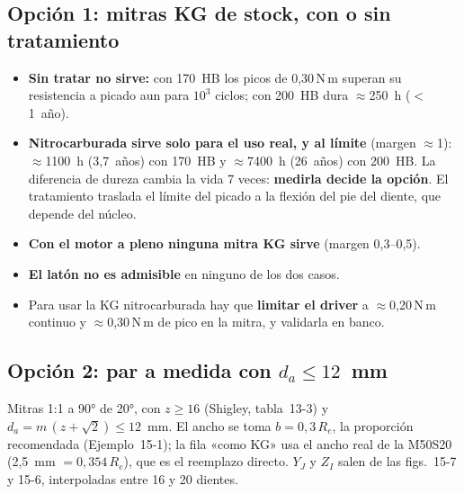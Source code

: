 \documentclass[11pt,a4paper]{article}
\newcommand{\Nm}{\,N\,m\xspace}
\begin{document}
\subsection{Opción 1: mitras KG de stock, con o sin tratamiento}
\begin{table}[H]\centering\small\setlength{\tabcolsep}{3pt}
\caption{Vida estimada de las mitras KG (d$_a$ 10,71~mm). Margen: torque admisible para 10~años sobre el aplicado,
continuo / pico. «a»: años de uso a 288~h por año.}
\label{tab:vida_kg}
\end{table}

\begin{itemize}
  \item \textbf{Sin tratar no sirve:} con 170~HB los picos de 0,30\Nm superan su resistencia a picado aun para $10^3$ ciclos;
        con 200~HB dura $\approx$250~h ($<$1~año).
  \item \textbf{Nitrocarburada sirve solo para el uso real, y al límite} (margen $\approx$1): $\approx$1100~h (3,7~años) con
        170~HB y $\approx$7400~h (26~años) con 200~HB. La diferencia de dureza cambia la vida 7 veces: \textbf{medirla
        decide la opción}. El tratamiento traslada el límite del picado a la flexión del pie del diente, que depende del núcleo.
  \item \textbf{Con el motor a pleno ninguna mitra KG sirve} (margen 0,3--0,5).
  \item \textbf{El latón no es admisible} en ninguno de los dos casos.
  \item Para usar la KG nitrocarburada hay que \textbf{limitar el driver} a $\approx$0,20\Nm continuo y $\approx$0,30\Nm de pico en
        la mitra, y validarla en banco.
\end{itemize}

\subsection{Opción 2: par a medida con $d_a\le12$~mm}
Mitras 1:1 a 90° de 20°, con $z\ge16$ (Shigley, tabla~13-3) y $d_a=m\,(z+\sqrt2)\le12$~mm.
El ancho se toma $b=0{,}3\,R_e$, la proporción recomendada (Ejemplo~15-1); la fila «como KG» usa el ancho real de la
M50S20 (2,5~mm $=0{,}354\,R_e$), que es el reemplazo directo. $Y_J$ y $Z_I$ salen de las figs.~15-7 y 15-6, interpoladas
entre 16 y 20 dientes.
\end{document}
